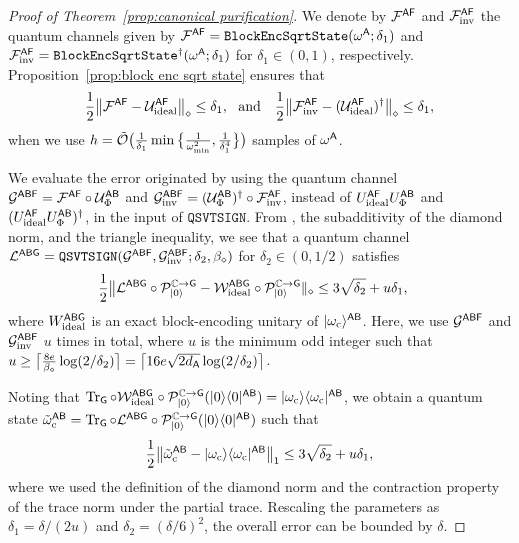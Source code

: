 \begin{proof}[Proof of Theorem~\ref{prop:canonical purification}]
We denote by ${\mathcal{F}}^{{\mathsf{A}}{\mathsf{F}}}$ and ${\mathcal{F}}_{\rm inv}^{{\mathsf{A}}{\mathsf{F}}}$ the quantum channels given by ${\mathcal{F}}^{{\mathsf{A}}{\mathsf{F}}} = \mathtt{BlockEncSqrtState}(\omega^{\mathsf{A}}; \delta_1)$ and ${\mathcal{F}}_{\rm inv}^{{\mathsf{A}}{\mathsf{F}}} = \mathtt{BlockEncSqrtState}^\dag(\omega^{\mathsf{A}}; \delta_1)$ for $\delta_1 \in (0, 1)$, respectively.
Proposition~\ref{prop:block enc sqrt state} ensures that
\begin{align}
    \frac{1}{2}\big\|{\mathcal{F}}^{{\mathsf{A}}{\mathsf{F}}} - {\mathcal{U}}_{\rm ideal}^{{\mathsf{A}}{\mathsf{F}}}\big\|_\diamond \leq \delta_1, \ \ \text{and} \ \ \ \frac{1}{2}\big\|{\mathcal{F}}_{\rm inv}^{{\mathsf{A}}{\mathsf{F}}} - ({\mathcal{U}}_{\rm ideal}^{{\mathsf{A}}{\mathsf{F}}})^\dag\big\|_\diamond \leq \delta_1,
\end{align}
when we use $h = \tilde{{\mathcal{O}}}\big(\frac{1}{\delta_1}\min\big\{\frac{1}{\omega_{\rm min}^2}, \frac{1}{\delta_1^4}\big\}\big)$ samples of $\omega^{\mathsf{A}}$.

We evaluate the error originated by using the quantum channel ${\mathcal{G}}^{{\mathsf{A}}{\mathsf{B}}{\mathsf{F}}} = {\mathcal{F}}^{{\mathsf{A}}{\mathsf{F}}}\circ{\mathcal{U}}_{\Phi}^{{\mathsf{A}}{\mathsf{B}}}$ and ${\mathcal{G}}_{\rm inv}^{{\mathsf{A}}{\mathsf{B}}{\mathsf{F}}} = ({\mathcal{U}}_{\Phi}^{{\mathsf{A}}{\mathsf{B}}})^\dag \circ {\mathcal{F}}_{\rm inv}^{{\mathsf{A}}{\mathsf{F}}}$, instead of $U_{\rm ideal}^{{\mathsf{A}}{\mathsf{F}}}U_{\Phi}^{{\mathsf{A}}{\mathsf{B}}}$ and $(U_{\rm ideal}^{{\mathsf{A}}{\mathsf{F}}}U_{\Phi}^{{\mathsf{A}}{\mathsf{B}}})^\dag$, in the input of $\mathtt{QSVTSIGN}$.
From , the subadditivity of the diamond norm, and the triangle inequality, we see that a quantum channel ${\mathcal{L}}^{{\mathsf{A}}{\mathsf{B}}{\mathsf{G}}} = \mathtt{QSVTSIGN}({\mathcal{G}}^{{\mathsf{A}}{\mathsf{B}}{\mathsf{F}}}, {\mathcal{G}}_{\rm inv}^{{\mathsf{A}}{\mathsf{B}}{\mathsf{F}}}; \delta_2, \beta_\diamond)$ for $\delta_2 \in (0, 1/2)$ satisfies
\begin{align}
    &\frac{1}{2}\big\|{\mathcal{L}}^{{\mathsf{A}}{\mathsf{B}}{\mathsf{G}}} \circ {\mathcal{P}}_{|0\rangle}^{\mathbb{C}\rightarrow{\mathsf{G}}} - {\mathcal{W}}_{\rm ideal}^{{\mathsf{A}}{\mathsf{B}}{\mathsf{G}}} \circ{\mathcal{P}}_{|0\rangle}^{\mathbb{C}\rightarrow{\mathsf{G}}}\|_\diamond \leq 3\sqrt{\delta_2} + u\delta_1,    
\end{align}
where $W_{\rm ideal}^{{\mathsf{A}}{\mathsf{B}}{\mathsf{G}}}$ is an exact block-encoding unitary of $|\omega_{\rm c}\rangle^{{\mathsf{A}}{\mathsf{B}}}$.
Here, we use ${\mathcal{G}}^{{\mathsf{A}}{\mathsf{B}}{\mathsf{F}}}$ and ${\mathcal{G}}_{\rm inv}^{{\mathsf{A}}{\mathsf{B}}{\mathsf{F}}}$ $u$ times in total, where $u$ is the minimum odd integer such that $u \geq \big\lceil\frac{8e}{\beta_\diamond}\log(2/\delta_2)\big\rceil = \big\lceil16e\sqrt{2d_{\mathsf{A}}}\log(2/\delta_2)\big\rceil$.



Noting that $\operatorname{Tr}_{\mathsf{G}}\circ{\mathcal{W}}_{\rm ideal}^{{\mathsf{A}}{\mathsf{B}}{\mathsf{G}}} \circ{\mathcal{P}}_{|0\rangle}^{\mathbb{C}\rightarrow{\mathsf{G}}}(|0\rangle\langle0|^{{\mathsf{A}}{\mathsf{B}}}) = |\omega_{\rm c}\rangle\langle\omega_{\rm c}|^{{\mathsf{A}}{\mathsf{B}}}$, we obtain a quantum state $\tilde{\omega}_{\rm c}^{{\mathsf{A}}{\mathsf{B}}} = \operatorname{Tr}_{\mathsf{G}}\circ{\mathcal{L}}^{{\mathsf{A}}{\mathsf{B}}{\mathsf{G}}}\circ{\mathcal{P}}_{|0\rangle}^{\mathbb{C}\rightarrow{\mathsf{G}}}(|0\rangle\langle0|^{{\mathsf{A}}{\mathsf{B}}})$ such that
\begin{align}
    \frac{1}{2}\big\|\tilde{\omega}_{\rm c}^{{\mathsf{A}}{\mathsf{B}}} - |\omega_{\rm c}\rangle\langle\omega_{\rm c}|^{{\mathsf{A}}{\mathsf{B}}}\big\|_1 \leq 3\sqrt{\delta_2} + u\delta_1,
\end{align}
where we used the definition of the diamond norm and the contraction property of the trace norm under the partial trace.
Rescaling the parameters as $\delta_1 = \delta/(2u)$ and $\delta_2 = (\delta/6)^2$, the overall error can be bounded by $\delta$.



\end{proof}
